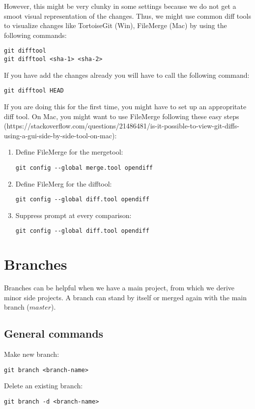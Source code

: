 \documentclass{article}
\begin{document}
However, this might be very clunky in some settings because we do not get a smoot visual representation of the changes. Thus, we might use common diff tools to visualize changes like TortoiseGit (Win), FileMerge (Mac) by using the following commands:
\begin{verbatim}
git difftool
git difftool <sha-1> <sha-2>
\end{verbatim}
If you have add the changes already you will have to call the following command:
\begin{verbatim}
git difftool HEAD
\end{verbatim}

If you are doing this for the first time, you might have to set up an appropritate diff tool.
On Mac, you might want to use FileMerge following these easy steps (https://stackoverflow.com/questions/21486481/is-it-possible-to-view-git-diffs-using-a-gui-side-by-side-tool-on-mac):
\begin{enumerate}
	\item Define FileMerge for the mergetool:
	\begin{verbatim}
git config --global merge.tool opendiff
	\end{verbatim}
	\item Define FileMerg for the difftool:
	\begin{verbatim}
git config --global diff.tool opendiff	
	\end{verbatim}		
	\item Suppress prompt at every comparison:
	\begin{verbatim}
git config --global diff.tool opendiff
	\end{verbatim}	
\end{enumerate}

\section{Branches}
Branches can be helpful when we have a main project, from which we derive minor side projects. A branch can stand by itself or merged again with the main branch ($master$).

\subsection{General commands}
Make new branch:
\begin{verbatim}
git branch <branch-name>
\end{verbatim}

Delete an existing branch:
\begin{verbatim}
git branch -d <branch-name>
\end{verbatim}
\end{document}

